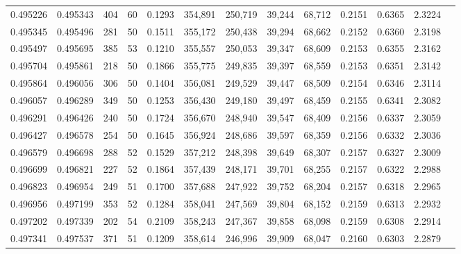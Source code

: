\begin{tabular}{rrrrrrrrrrrrr}
0.495226 & 0.495343 &   404 &  60 &                                     0.1293 & 354,891 & 250,719 &  39,244 &  68,712 & 0.2151 & 0.6365 & 2.3224 \\
0.495345 & 0.495496 &   281 &  50 &                                     0.1511 & 355,172 & 250,438 &  39,294 &  68,662 & 0.2152 & 0.6360 & 2.3198 \\
0.495497 & 0.495695 &   385 &  53 &                                     0.1210 & 355,557 & 250,053 &  39,347 &  68,609 & 0.2153 & 0.6355 & 2.3162 \\
0.495704 & 0.495861 &   218 &  50 &                                     0.1866 & 355,775 & 249,835 &  39,397 &  68,559 & 0.2153 & 0.6351 & 2.3142 \\
0.495864 & 0.496056 &   306 &  50 &                                     0.1404 & 356,081 & 249,529 &  39,447 &  68,509 & 0.2154 & 0.6346 & 2.3114 \\
0.496057 & 0.496289 &   349 &  50 &                                     0.1253 & 356,430 & 249,180 &  39,497 &  68,459 & 0.2155 & 0.6341 & 2.3082 \\
0.496291 & 0.496426 &   240 &  50 &                                     0.1724 & 356,670 & 248,940 &  39,547 &  68,409 & 0.2156 & 0.6337 & 2.3059 \\
0.496427 & 0.496578 &   254 &  50 &                                     0.1645 & 356,924 & 248,686 &  39,597 &  68,359 & 0.2156 & 0.6332 & 2.3036 \\
0.496579 & 0.496698 &   288 &  52 &                                     0.1529 & 357,212 & 248,398 &  39,649 &  68,307 & 0.2157 & 0.6327 & 2.3009 \\
0.496699 & 0.496821 &   227 &  52 &                                     0.1864 & 357,439 & 248,171 &  39,701 &  68,255 & 0.2157 & 0.6322 & 2.2988 \\
0.496823 & 0.496954 &   249 &  51 &                                     0.1700 & 357,688 & 247,922 &  39,752 &  68,204 & 0.2157 & 0.6318 & 2.2965 \\
0.496956 & 0.497199 &   353 &  52 &                                     0.1284 & 358,041 & 247,569 &  39,804 &  68,152 & 0.2159 & 0.6313 & 2.2932 \\
0.497202 & 0.497339 &   202 &  54 &                                     0.2109 & 358,243 & 247,367 &  39,858 &  68,098 & 0.2159 & 0.6308 & 2.2914 \\
0.497341 & 0.497537 &   371 &  51 &                                     0.1209 & 358,614 & 246,996 &  39,909 &  68,047 & 0.2160 & 0.6303 & 2.2879 \\

\end{tabular}
